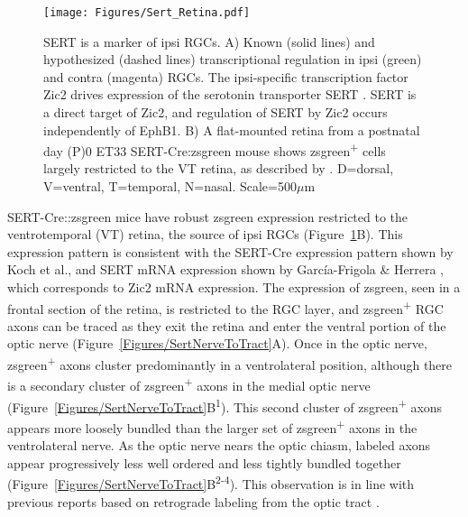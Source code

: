 \begin{figure}[hbtp]
    \begin{center}
        \texttt{[image: Figures/Sert\_Retina.pdf]}
        \caption[SERT is a marker of ipsi RGCs.]
        {SERT is a marker of ipsi RGCs.
        A) Known (solid lines) and hypothesized (dashed lines) transcriptional regulation in ipsi (green) and contra (magenta) RGCs.
        The ipsi-specific transcription factor Zic2 drives expression of the serotonin transporter SERT \cite{garcia2010zic2}.
        SERT is a direct target of Zic2, and regulation of SERT by Zic2 occurs independently of EphB1.
        B) A flat-mounted retina from a postnatal day (P)0 ET33 SERT-Cre:zsgreen mouse shows zsgreen\textsuperscript{+} cells largely restricted to the VT retina, as described by .
        D=dorsal, V=ventral, T=temporal, N=nasal.
        Scale=500$\mu$m}
        \label{Figures/SertRetina}
    \end{center}
\end{figure}

SERT-Cre::zsgreen mice have robust zsgreen expression restricted to the ventrotemporal (VT) retina, the source of ipsi RGCs (Figure~\ref{Figures/SertRetina}B).
This expression pattern is consistent with the SERT-Cre expression pattern shown by Koch et al.,  and SERT mRNA expression shown by Garc\'ia-Frigola \& Herrera , which corresponds to Zic2 mRNA expression.
The expression of zsgreen, seen in a frontal section of the retina, is restricted to the RGC layer, and zsgreen\textsuperscript{+} RGC axons can be traced as they exit the retina and enter the ventral portion of the optic nerve (Figure~\ref{Figures/SertNerveToTract}A).
Once in the optic nerve, zsgreen\textsuperscript{+} axons cluster predominantly in a ventrolateral position, although there is a secondary cluster of zsgreen\textsuperscript{+} axons in the medial optic nerve (Figure~\ref{Figures/SertNerveToTract}B\textsuperscript{1}).
This second cluster of zsgreen\textsuperscript{+} axons appears more loosely bundled than the larger set of zsgreen\textsuperscript{+} axons in the ventrolateral nerve.
As the optic nerve nears the optic chiasm, labeled axons appear progressively less well ordered and less tightly bundled together (Figure~\ref{Figures/SertNerveToTract}B\textsuperscript{2-4}).
This observation is in line with previous reports based on retrograde labeling from the optic tract \cite{colello1990early}.

